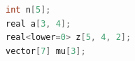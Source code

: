 \begin{lstlisting}[language=C++,label={code:PRE_01},caption={Stan2.26以前の書き方}]
int n[5];
real a[3, 4];
real<lower=0> z[5, 4, 2];
vector[7] mu[3];
\end{lstlisting}
